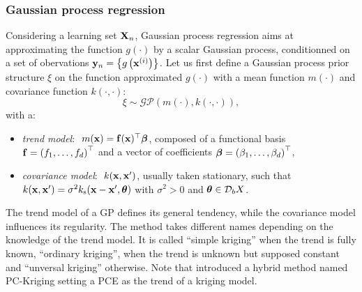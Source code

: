 \subsubsection{Gaussian process regression}

Considering a learning set ${\bf X}_n$, Gaussian process regression aims at approximating the function $g(\cdot)$ by a scalar Gaussian process, conditionned on a set of obervations ${\bf y}_n = \left\{g\left({\bf x}^{(i)}\right)\right\}$. 
Let us first define a Gaussian process prior structure $\xi$ on the function approximated $g(\cdot)$ with a mean function $m(\cdot)$ and covariance function $k(\cdot, \cdot)$:  
\begin{equation}
    \xi \sim \mathcal{GP}(m(\cdot), k(\cdot, \cdot)),
\end{equation} 
with a: 
\begin{itemize}
    \item \textit{trend model}: $~m({\bf x}) = \mathbf{f}({\bf x})^\top {\boldsymbol{\beta}}$, composed of a functional basis $\mathbf{f} = \left(f_1, \dots, f_d\right)^\top$ and a vector of coefficients 
    ${\boldsymbol{\beta}} = \left(\beta_1, \dots, \beta_d\right)^\top$,
    \item \textit{covariance model}: $~k({\bf x}, {\bf x}')$, usually taken stationary, such that $k({\bf x}, {\bf x}') = \sigma^2 k_{\mathrm{s}}({\bf x} - {\bf x}', {\boldsymbol{\theta}})$ with $\sigma^2>0$ and ${\boldsymbol{\theta}} \in \mathcal{D}_bX$.
\end{itemize}
The trend model of a GP defines its general tendency, while the covariance model influences its regularity.
The method takes different names depending on the knowledge of the trend model. 
It is called ``simple kriging'' when the trend is fully known, ``ordinary kriging'', when the trend is unknown but supposed constant and ``unversal kriging'' otherwise. 
Note that \cite{schobi_2015} introduced a hybrid method named PC-Kriging setting a PCE as the trend of a kriging model.   

